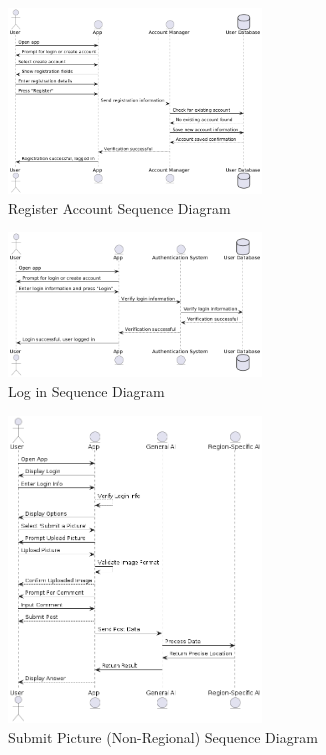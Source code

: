 \documentclass[]{article}
\begin{document}

\begin{figure}[H]
    \centering
    \includegraphics[width=0.6\textwidth]{out/sequence1/sequence1.png} %
    \caption{Register Account Sequence Diagram}
\end{figure}

\begin{figure}[H]
    \centering
    \includegraphics[width=0.6\textwidth]{out/sequence2/sequence2.png} %
    \caption{Log in Sequence Diagram}
\end{figure}


\begin{figure}[H]
    \centering
    \includegraphics[width=0.6\textwidth]{out/sequence3/sequence3.png} %
    \caption{Submit Picture (Non-Regional) Sequence Diagram}
\end{figure}
\end{document}

